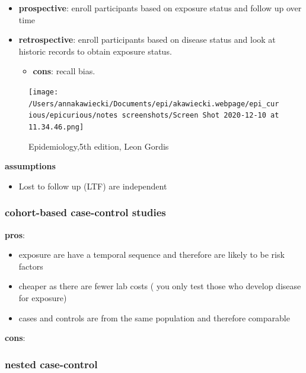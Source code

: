 \documentclass[
]{article}
\providecommand{\tightlist}{%
  \setlength{\itemsep}{0pt}\setlength{\parskip}{0pt}}
\begin{document}
\begin{itemize}
\item
  \textbf{prospective}: enroll participants based on exposure status and
  follow up over time
\item
  \textbf{retrospective}: enroll participants based on disease status
  and look at historic records to obtain exposure status.

  \begin{itemize}
  \tightlist
  \item
    \textbf{cons}: recall bias.
  \end{itemize}
\end{itemize}

\begin{figure}
\centering
\texttt{[image: /Users/annakawiecki/Documents/epi/akawiecki.webpage/epi\_curious/epicurious/notes screenshots/Screen Shot 2020-12-10 at 11.34.46.png]}
\caption{Epidemiology,5th edition, Leon Gordis}
\end{figure}

\textbf{assumptions}

\begin{itemize}
\tightlist
\item
  Lost to follow up (LTF) are independent
\end{itemize}

\hypertarget{cohort-based-case-control-studies}{%
\subsubsection{\texorpdfstring{\textbf{cohort-based case-control
studies}}{cohort-based case-control studies}}\label{cohort-based-case-control-studies}}

\textbf{pros}:

\begin{itemize}
\item
  exposure are have a temporal sequence and therefore are likely to be
  risk factors
\item
  cheaper as there are fewer lab costs ( you only test those who develop
  disease for exposure)
\item
  cases and controls are from the same population and therefore
  comparable
\end{itemize}

\textbf{cons}:

\hypertarget{nested-case-control}{%
\subsubsection{nested case-control}\label{nested-case-control}}
\end{document}
